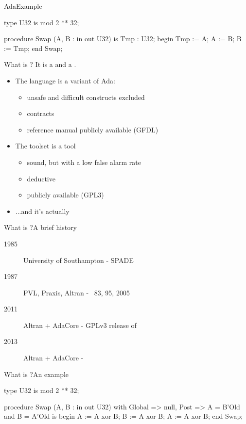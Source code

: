 \documentclass{beamer}
\begin{document}
\begin{frame}[fragile]{Ada}{Example}
\begin{pxcode}[language=SPARK,gobble=3]
    type U32 is mod 2 ** 32;

    procedure Swap (A, B : in out U32)
    is
       Tmp : U32;
    begin
       Tmp := A;
       A   := B;
       B   := Tmp;
    end Swap;
\end{pxcode}
\end{frame}

\begin{frame}{What is \spark?}
  It is a  and a .
  \begin{itemize}
  \item The language is a variant of Ada:
    \begin{itemize}
    \item unsafe and difficult constructs excluded
    \item contracts
    \item reference manual publicly available (GFDL)
    \end{itemize}
  \item The toolset is a  tool
    \begin{itemize}
    \item sound, but with a low false alarm rate
    \item deductive
    \item publicly available (GPL3)
    \end{itemize}
    \pause
  \item ...and it's actually 
  \end{itemize}
\end{frame}

\begin{frame}{What is \spark?}{A brief history}
  \begin{description}
  \item[1985] University of Southampton - SPADE
  \item[1987] PVL, Praxis, Altran - \spark\ 83, 95, 2005
  \item[2011] Altran + AdaCore - GPLv3 release of \spark
  \item[2013] Altran + AdaCore - 
  \end{description}
\end{frame}

\begin{frame}[fragile]{What is \spark?}{An example}
  \begin{pxcode}[language=SPARK,gobble=4]
    type U32 is mod 2 ** 32;

    procedure Swap (A, B : in out U32)
    with
       Global => null,
       Post   => A = B'Old and
                 B = A'Old
    is
    begin
       A := A xor B;
       B := A xor B;
       A := A xor B;
    end Swap;
  \end{pxcode}
\end{frame}
\end{document}
